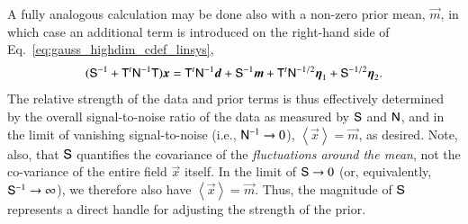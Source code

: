 \documentclass[onecolumn]{aa}
\renewcommand{\d}[0]{\vec{d}}
\newcommand{\x}[0]{\vec{x}}
\newcommand{\m}[0]{\vec{m}}
\newcommand{\F}[0]{\tens{F}}
\newcommand{\T}[0]{\tens{T}}
\newcommand{\N}[0]{\tens{N}}
\newcommand{\I}[0]{\tens{I}}
\renewcommand{\S}[0]{\tens{S}}
\begin{document}
A fully analogous calculation may be done also with a non-zero prior
mean, $\m$, in which case an additional term is introduced on
the right-hand side of Eq.~\eqref{eq:gauss_highdim_cdef_linsys},
\begin{equation}
  (\S^{-1} + \T^t\N^{-1}\T)\x = \T^t\N^{-1}\d + \S^{-1}\m + \T^t\N^{-1/2}\vec{\eta}_1 +
    \S^{-1/2}\vec{\eta}_2. 
  \label{eq:gauss_highdim_prior}
\end{equation}
The relative strength of the data and prior terms is thus effectively
determined by the overall signal-to-noise ratio of the data as
measured by $\S$ and $\N$, and in the limit of vanishing
signal-to-noise (i.e., $\N^{-1}\rightarrow0$), $\left<\x\right>=\m$,
as desired. Note, also, that $\S$ quantifies the covariance of the
\emph{fluctuations around the mean}, not the co-variance of the entire
field $\x$ itself. In the limit of $\S\rightarrow0$ (or, equivalently,
$\S^{-1}\rightarrow\infty$), we therefore also have
$\left<\x\right>=\m$. Thus, the magnitude of $\S$ represents a direct
handle for adjusting the strength of the prior.



\end{document}
